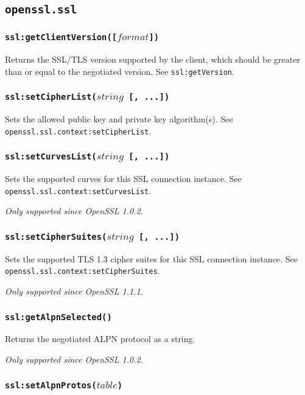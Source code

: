 \documentclass[11pt, oneside]{memoir}
\newcommand*{\fn}[1]{\texttt{#1}\xspace}
\newcounter{toccols}
\newenvironment{Module}[1]{
	\subsection{\texttt{#1}}
	\addtocontents{toc}{
		\protect\begin{multicols}{\value{toccols}}
	}
}{
	\addtocontents{toc}{\protect\end{multicols}}
}
\begin{document}
\begin{Module}{openssl.ssl}
\subsubsection[\fn{ssl:getClientVersion}]{\fn{ssl:getClientVersion([$format$])}}

Returns the SSL/TLS version supported by the client, which should be greater than or equal to the negotiated version. See \fn{ssl:getVersion}.

\subsubsection[\fn{ssl:setCipherList}]{\fn{ssl:setCipherList($string$ [, ...])}}

Sets the allowed public key and private key algorithm(s). See \fn{openssl.ssl.context:setCipherList}.

\subsubsection[\fn{ssl:setCurvesList}]{\fn{ssl:setCurvesList($string$ [, ...])}}

Sets the supported curves for this SSL connection instance. See \fn{openssl.ssl.context:setCurvesList}.

\emph{Only supported since OpenSSL 1.0.2.}

\subsubsection[\fn{ssl:setCipherSuites}]{\fn{ssl:setCipherSuites($string$ [, ...])}}

Sets the supported TLS 1.3 cipher suites for this SSL connection instance. See \fn{openssl.ssl.context:setCipherSuites}.

\emph{Only supported since OpenSSL 1.1.1.}

\subsubsection[\fn{ssl:getAlpnSelected}]{\fn{ssl:getAlpnSelected()}}

Returns the negotiated ALPN protocol as a string.

\emph{Only supported since OpenSSL 1.0.2.}

\subsubsection[\fn{ssl:setAlpnProtos}]{\fn{ssl:setAlpnProtos($table$)}}


\end{Module}
\end{document}
